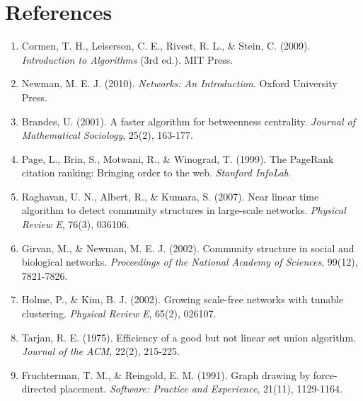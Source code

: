 \documentclass[12pt,a4paper]{article}
\begin{document}
\section{References}

\begin{enumerate}
    \item Cormen, T. H., Leiserson, C. E., Rivest, R. L., \& Stein, C. (2009). \textit{Introduction to Algorithms} (3rd ed.). MIT Press.
    
    \item Newman, M. E. J. (2010). \textit{Networks: An Introduction}. Oxford University Press.
    
    \item Brandes, U. (2001). A faster algorithm for betweenness centrality. \textit{Journal of Mathematical Sociology}, 25(2), 163-177.
    
    \item Page, L., Brin, S., Motwani, R., \& Winograd, T. (1999). The PageRank citation ranking: Bringing order to the web. \textit{Stanford InfoLab}.
    
    \item Raghavan, U. N., Albert, R., \& Kumara, S. (2007). Near linear time algorithm to detect community structures in large-scale networks. \textit{Physical Review E}, 76(3), 036106.
    
    \item Girvan, M., \& Newman, M. E. J. (2002). Community structure in social and biological networks. \textit{Proceedings of the National Academy of Sciences}, 99(12), 7821-7826.
    
    \item Holme, P., \& Kim, B. J. (2002). Growing scale-free networks with tunable clustering. \textit{Physical Review E}, 65(2), 026107.
    
    \item Tarjan, R. E. (1975). Efficiency of a good but not linear set union algorithm. \textit{Journal of the ACM}, 22(2), 215-225.
    
    \item Fruchterman, T. M., \& Reingold, E. M. (1991). Graph drawing by force-directed placement. \textit{Software: Practice and Experience}, 21(11), 1129-1164.
\end{enumerate}
\end{document}
